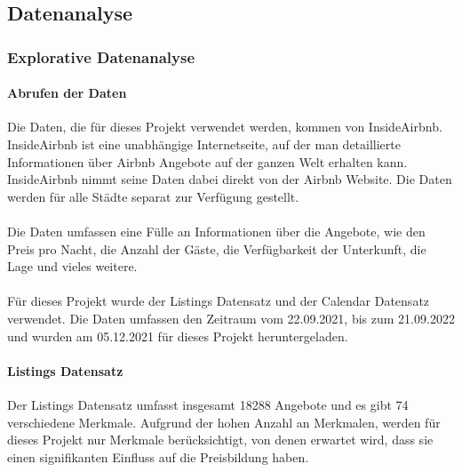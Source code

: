 \documentclass[12pt]{article}
\begin{document}
\begin{text}
\newpage
\part{Datenanalyse}
\section{Explorative Datenanalyse} 
\subsection{Abrufen der Daten}
Die Daten, die für dieses Projekt verwendet werden, kommen von InsideAirbnb. InsideAirbnb ist eine unabhängige Internetseite, auf der man detaillierte Informationen über Airbnb Angebote auf der ganzen Welt erhalten kann. InsideAirbnb nimmt seine Daten dabei direkt von der Airbnb Website. Die Daten werden für alle  Städte separat zur Verfügung gestellt.
\\\\
Die Daten umfassen eine Fülle an Informationen über die Angebote, wie den Preis pro Nacht, die Anzahl der Gäste, die Verfügbarkeit der Unterkunft, die Lage und vieles weitere.
\\\\
Für dieses Projekt wurde der Listings Datensatz und der Calendar Datensatz verwendet. Die Daten umfassen den Zeitraum vom 22.09.2021, bis zum 21.09.2022 und wurden am 05.12.2021 für dieses Projekt heruntergeladen.

\newpage
\subsection{Listings Datensatz}
Der Listings Datensatz umfasst insgesamt 18288 Angebote und es gibt 74 verschiedene Merkmale. Aufgrund der hohen Anzahl an Merkmalen, werden für dieses Projekt nur Merkmale berücksichtigt, von denen erwartet wird, dass sie einen signifikanten Einfluss auf die Preisbildung haben.



\end{text}
\end{document}
